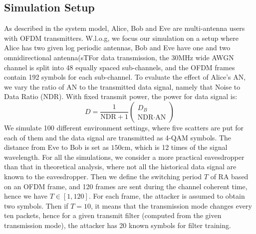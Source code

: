 \subsection{Simulation Setup}
As described in the system model, Alice, Bob and Eve are multi-antenna users with OFDM transmitters. W.l.o.g, we focus our simulation on a setup where Alice has two given log periodic antennas, Bob and Eve have one and two omnidirectional antenna(sTFor data transmission, the 30MHz wide AWGN channel is split into 48 equally spaced sub-channels, and the OFDM frames contain 192 symbols for each sub-channel. To evaluate the effect of Alice's AN, we vary the ratio of AN to the transmitted data signal, namely that Noise to Data Ratio (NDR). With fixed transmit power, the power for data signal is:
\begin{equation}
    D = \frac{1}{\text{NDR}+1}\begin{pmatrix}
        D_B\\
        \text{NDR} \cdot \text{AN}
    \end{pmatrix} 
\end{equation}
We simulate 100 different environment settings, where five scatters are put for each of them and the data signal are transmitted as 4-QAM symbols. The distance from Eve to Bob is set as $150$cm, which is 12 times of the signal wavelength. For all the simulations, we consider a more practical eavesdropper than that in theoretical analysis, where not all the historical data signal are known to the eavesdropper. Then we define the switching period $T$ of RA based on an OFDM frame, and 120 frames are sent during the channel coherent time, hence we have $T \in [1,120]$. For each frame, the attacker is assumed to obtain two symbols. 
Then if $T = 10$, it means that the transmission mode changes every ten packets, hence for a given transmit filter (computed from the given transmission mode), the attacker has 20 known symbols for filter training.

